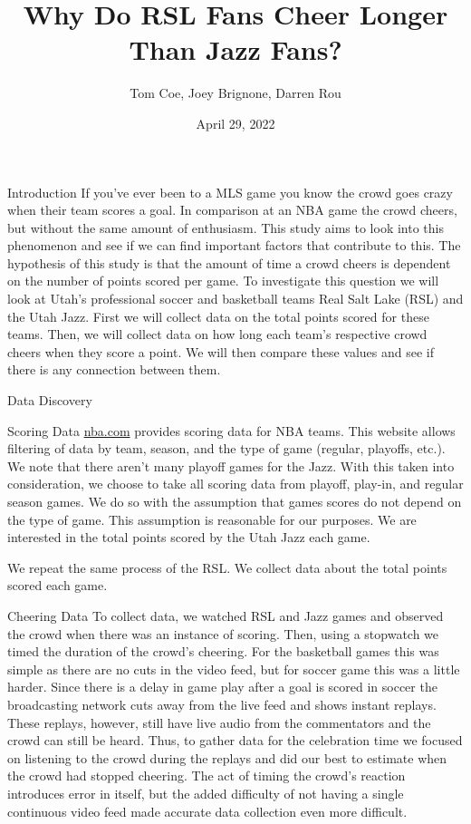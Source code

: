 \documentclass[
  ignorenonframetext,
]{beamer}
\title{Why Do RSL Fans Cheer Longer Than Jazz Fans?}
\author{Tom Coe, Joey Brignone, Darren Rou}
\date{April 29, 2022}
\begin{document}
\frame{\titlepage}

\begin{frame}{Introduction}
\protect\hypertarget{introduction}{}
If you've ever been to a MLS game you know the crowd goes crazy when
their team scores a goal. In comparison at an NBA game the crowd cheers,
but without the same amount of enthusiasm. This study aims to look into
this phenomenon and see if we can find important factors that contribute
to this. The hypothesis of this study is that the amount of time a crowd
cheers is dependent on the number of points scored per game. To
investigate this question we will look at Utah's professional soccer and
basketball teams Real Salt Lake (RSL) and the Utah Jazz. First we will
collect data on the total points scored for these teams. Then, we will
collect data on how long each team's respective crowd cheers when they
score a point. We will then compare these values and see if there is any
connection between them.
\end{frame}

\begin{frame}{Data Discovery}
\protect\hypertarget{data-discovery}{}
\begin{block}{Scoring Data}
\protect\hypertarget{scoring-data}{}
\href{https://www.nba.com/stats/teams/boxscores/?Season=2020-21\&SeasonType=Regular\%20Season\&CF=TEAM_NAME*E*Utah\%20Jazz}{nba.com}
provides scoring data for NBA teams. This website allows filtering of
data by team, season, and the type of game (regular, playoffs, etc.). We
note that there aren't many playoff games for the Jazz. With this taken
into consideration, we choose to take all scoring data from playoff,
play-in, and regular season games. We do so with the assumption that
games scores do not depend on the type of game. This assumption is
reasonable for our purposes. We are interested in the total points
scored by the Utah Jazz each game.

We repeat the same process of the RSL. We collect data about the total
points scored each game.
\end{block}

\begin{block}{Cheering Data}
\protect\hypertarget{cheering-data}{}
To collect data, we watched RSL and Jazz games and observed the crowd
when there was an instance of scoring. Then, using a stopwatch we timed
the duration of the crowd's cheering. For the basketball games this was
simple as there are no cuts in the video feed, but for soccer game this
was a little harder. Since there is a delay in game play after a goal is
scored in soccer the broadcasting network cuts away from the live feed
and shows instant replays. These replays, however, still have live audio
from the commentators and the crowd can still be heard. Thus, to gather
data for the celebration time we focused on listening to the crowd
during the replays and did our best to estimate when the crowd had
stopped cheering. The act of timing the crowd's reaction introduces
error in itself, but the added difficulty of not having a single
continuous video feed made accurate data collection even more difficult.
\end{block}
\end{frame}
\end{document}
